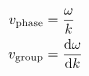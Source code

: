 

\vspace*{\fill}
\centering

\begin{align*}
    v_{\rm phase} &= \frac{\omega}{k} \\
    v_{\rm group} &= \dv{\omega}{k}
\end{align*}

\centering
\vspace*{\fill}

